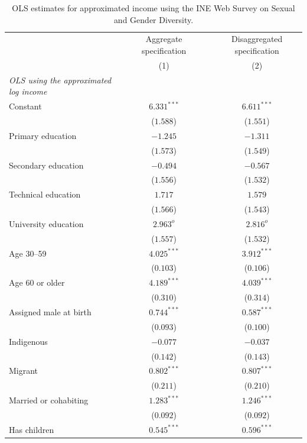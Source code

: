 \begin{table}[H]
\begin{center}
\begin{threeparttable}
\captionsetup{margin=0.5cm}
\caption{OLS estimates for approximated income using the INE Web Survey on Sexual and Gender Diversity.}
\label{tab:ine_mco}
\footnotesize
\centering
\begin{tabular}{lccc}
\toprule
 & \multicolumn{1}{c}{Aggregate specification} & & \multicolumn{1}{c}{Disaggregated specification} \\ 
 & (1) & & (2) \\ \midrule
\textit{OLS using the approximated log income} & &  &  \\ 
Constant & $6.331^{***}$ & & $6.611^{***}$ \\ 
 & ($1.588$) & & ($1.551$) \\ 
Primary education & $-1.245$ & & $-1.311$ \\ 
 & ($1.573$) & & ($1.549$) \\ 
Secondary education & $-0.494$ & & $-0.567$ \\ 
 & ($1.556$) & & ($1.532$) \\ 
Technical education & $1.717$ & & $1.579$ \\ 
 & ($1.566$) & & ($1.543$) \\ 
University education & $2.963^{o}$ & & $2.816^{o}$ \\ 
 & ($1.557$) & & ($1.532$) \\ 
Age 30--59 & $4.025^{***}$ & & $3.912^{***}$ \\ 
 & ($0.103$) & & ($0.106$) \\ 
Age 60 or older & $4.189^{***}$ & & $4.039^{***}$ \\ 
 & ($0.310$) & & ($0.314$) \\ 
Assigned male at birth & $0.744^{***}$ & & $0.587^{***}$ \\ 
 & ($0.093$) & & ($0.100$) \\ 
Indigenous & $-0.077$ & & $-0.037$ \\ 
 & ($0.142$) & & ($0.143$) \\ 
Migrant & $0.802^{***}$ & & $0.807^{***}$ \\ 
 & ($0.211$) & & ($0.210$) \\ 
Married or cohabiting & $1.283^{***}$ & & $1.246^{***}$ \\ 
 & ($0.092$) & & ($0.092$) \\ 
Has children & $0.545^{***}$ & & $0.596^{***}$ \\ 

\end{tabular}
\end{threeparttable}
\end{center}
\end{table}
